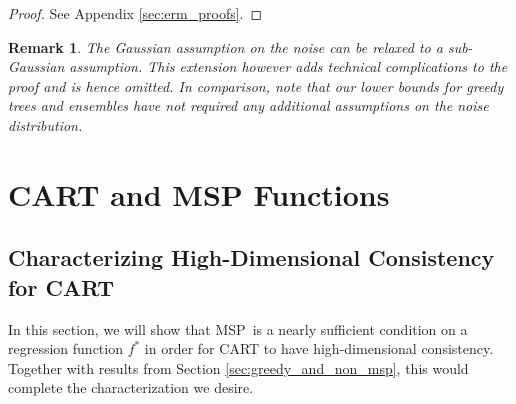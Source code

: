 \documentclass[11pt]{article}
\newtheorem{proposition}[theorem]{Proposition}
\newtheorem{remark}[theorem]{Remark}
\newcommand{\E}{\mathbb{E}}
\newcommand{\sparsity}{s}
\newcommand{\nfeats}{d}
\newcommand{\nsamples}{n}
\newcommand{\funcclass}{\mathfrak{F}}
\newcommand{\MSP}{\textsf{MSP}}
\newcommand{\ferm}{\hat{f}_{\operatorname{ERM}}}
\newcommand{\sparsefuncs}{\funcclass_\sparsity}
\begin{document}
\begin{proof}
    See Appendix \ref{sec:erm_proofs}.
\end{proof}

\begin{remark}
    The Gaussian assumption on the noise can be relaxed to a sub-Gaussian assumption.
    This extension however adds technical complications to the proof and is hence omitted.
    In comparison, note that our lower bounds for greedy trees and ensembles have not required any additional assumptions on the noise distribution.
\end{remark}




\section{CART and MSP Functions}

\subsection{Characterizing High-Dimensional Consistency for CART}
\label{sec:characterizing_CART}

In this section, we will show that \MSP~is a nearly sufficient condition on a regression function $f^*$ in order for CART to have high-dimensional consistency.
Together with 
results from Section \ref{sec:greedy_and_non_msp}, this would complete the characterization we desire.
\end{document}
